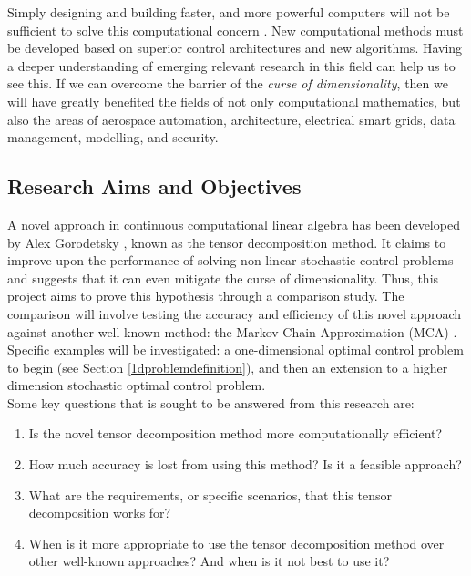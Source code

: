 \documentclass[11pt,draftd]{article}
\begin{document}
Simply designing and building faster, and more powerful computers will not be sufficient to solve this computational concern \cite{powersystem}. New computational methods must be developed based on superior control architectures and new algorithms. Having a deeper understanding of emerging relevant research in this field can help us to see this. If we can overcome the barrier of the \textit{curse of dimensionality}, then we will have greatly benefited the fields of not only computational mathematics, but also the areas of aerospace automation, architecture, electrical smart grids, data management, modelling, and security.\\

\subsection{Research Aims and Objectives}
A novel approach in continuous computational linear algebra has been developed by Alex Gorodetsky \cite{alex-c3}, known as the tensor decomposition method. It claims to improve upon the performance of solving non linear stochastic control problems and suggests that it can even mitigate the curse of dimensionality. Thus, this project aims to prove this hypothesis through a comparison study. The comparison will involve testing the accuracy and efficiency of this novel approach against another well-known method: the Markov Chain Approximation (MCA) \cite{kushner}. \\

Specific examples will be investigated: a one-dimensional optimal control problem to begin (see Section \ref{1dproblemdefinition}), and then an extension to a higher dimension stochastic optimal control problem. \\

Some key questions that is sought to be answered from this research are:
\begin{enumerate}
	\item Is the novel tensor decomposition method more computationally efficient?
	\item How much accuracy is lost from using this method? Is it a feasible approach?
	\item What are the requirements, or specific scenarios, that this tensor decomposition works for?
	\item When is it more appropriate to use the tensor decomposition method over other well-known approaches? And when is it not best to use it?
\end{enumerate}
\newpage
\end{document}
